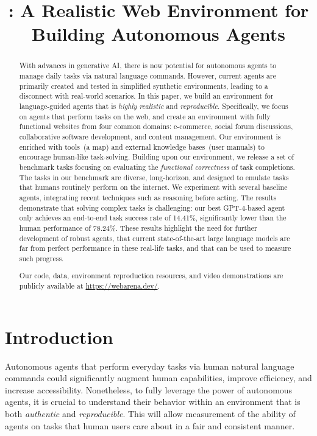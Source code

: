 \title{\ours: A Realistic Web Environment for Building Autonomous Agents}



\maketitle

\begin{abstract}
With advances in generative AI, there is now potential for autonomous agents to manage daily tasks via natural language commands. However, current agents are primarily created and tested in simplified synthetic environments, leading to a disconnect with real-world scenarios.
In this paper, we build an environment for language-guided agents that is \emph{highly realistic} and \emph{reproducible}.
Specifically, we focus on agents that perform tasks on the web, and create an environment with fully functional websites from four common domains: e-commerce, social forum discussions, collaborative software development, and content management.
Our environment is enriched with tools~(\eg a map) and external knowledge bases~(\eg user manuals) to encourage human-like task-solving.
Building upon our environment, we release a set of benchmark tasks focusing on evaluating the \emph{functional correctness} of task completions.
The tasks in our benchmark are diverse, long-horizon, and designed to emulate tasks that humans routinely perform on the internet.
We experiment with several baseline agents, integrating recent techniques such as reasoning before acting. 
The results demonstrate that solving complex tasks is challenging: our best \textsc{GPT-4}-based agent only achieves an end-to-end task success rate of 14.41\%, significantly lower than the human performance of 78.24\%.
These results highlight the need for further development of robust agents, that current state-of-the-art large language models are far from perfect performance in these real-life tasks, and that \ours can be used to measure such progress.%

Our code, data, environment reproduction resources, and video demonstrations are publicly available at \url{https://webarena.dev/}.
\end{abstract}

\section{Introduction}\label{sec:intro}
Autonomous agents that  perform everyday tasks via human natural language commands could significantly augment human capabilities, improve efficiency, and increase accessibility.
Nonetheless, to fully leverage the power of autonomous agents, it is crucial to understand their behavior within an environment that is both \emph{authentic} and \emph{reproducible}.
This will allow measurement of the ability of agents on tasks that human users care about in a fair and consistent manner.

